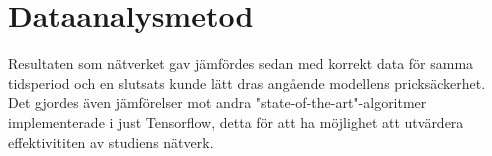 \section{Dataanalysmetod} 
Resultaten som nätverket gav jämfördes sedan med korrekt data för samma tidsperiod och en slutsats kunde lätt dras angående modellens pricksäckerhet. Det gjordes även jämförelser mot andra "state-of-the-art"-algoritmer implementerade i just Tensorflow, detta för att ha möjlighet att utvärdera effektivititen av studiens nätverk. 
